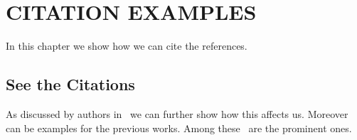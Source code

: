 \chapter{CITATION EXAMPLES}\label{ch:citations}

In this chapter we show how we can cite the references.


\section{See the Citations}

As discussed by authors in~\cite{abdullah2013vlsi} we can further show
how this affects
us. Moreover~\cite{MCNC,guo2001floorplanning,analyseit,holland1975as,aickelin2005artificial,al2010artificial}
can be examples for the previous works. Among
these~\cite{analyseit,aickelin2005artificial} are the prominent ones.


\endinput

